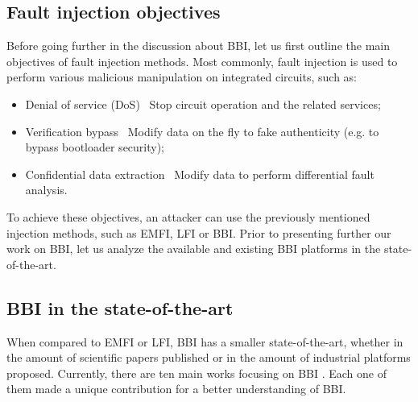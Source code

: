 
	\subsection{Fault injection objectives}
		Before going further in the discussion about BBI, let us first outline the main objectives of fault injection methods.
		Most commonly, fault injection is used to perform various malicious manipulation on integrated circuits, such as:
		\begin{itemize}
			\item Denial of service (DoS) \textrightarrow\ Stop circuit operation and the related services;
			\item Verification bypass \textrightarrow\ Modify data on the fly to fake authenticity (e.g. to bypass bootloader security);
			\item Confidential data extraction \textrightarrow\ Modify data to perform differential fault analysis.
		\end{itemize}
		To achieve these objectives, an attacker can use the previously mentioned injection methods, such as EMFI, LFI or BBI.
		Prior to presenting further our work on BBI, let us analyze the available and existing BBI platforms in the state-of-the-art.

	\subsection{BBI in the state-of-the-art}
%
		When compared to EMFI or LFI, BBI has a smaller state-of-the-art, whether in the amount of scientific papers published or in the amount of industrial platforms proposed.
		Currently, there are ten main works focusing on BBI \cite{bbiOrigin, bbiSecond, bbiThird, bbiColin,japbbi, japbbi2, mybbiCosade, mybbiFdtc2022, mybbifdtc2023, colinFdtc2023}.
		Each one of them made a unique contribution for a better understanding of BBI.

